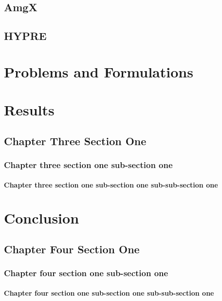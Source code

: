 \section{AmgX}

\section{HYPRE}





\chapter{Problems and Formulations}

\chapter{Results}
\section{Chapter Three Section One}
\subsection{Chapter three section one sub-section one}
\subsubsection{Chapter three section one sub-section one sub-sub-section one}


\chapter{Conclusion}
\section{Chapter Four Section One}
\subsection{Chapter four section one sub-section one}
\subsubsection{Chapter four section one sub-section one sub-sub-section one}

